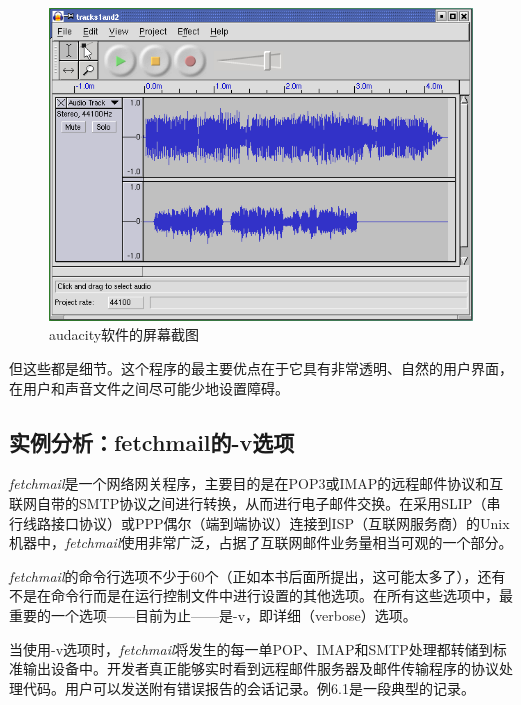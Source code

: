 \documentclass[12pt,oneside]{book}
\begin{document}
\begin{figure}[H]
\centering
\includegraphics[width=\linewidth ,totalheight=0.95\textheight , keepaspectratio]{audacity.png}
\caption{audacity软件的屏幕截图}
\end{figure}


但这些都是细节。这个程序的最主要优点在于它具有非常透明、自然的用户界面，在用户和声音文件之间尽可能少地设置障碍。

\subsection{实例分析：fetchmail的-v选项}
\textit{fetchmail}是一个网络网关程序，主要目的是在POP3或IMAP的远程邮件协议和互联网自带的SMTP协议之间进行转换，从而进行电子邮件交换。在采用SLIP（串行线路接口协议）或PPP偶尔（端到端协议）连接到ISP（互联网服务商）的Unix机器中，\textit{fetchmail}使用非常广泛，占据了互联网邮件业务量相当可观的一个部分。

\textit{fetchmail}的命令行选项不少于60个（正如本书后面所提出，这可能太多了），还有不是在命令行而是在运行控制文件中进行设置的其他选项。在所有这些选项中，最重要的一个选项——目前为止——是-v，即详细（verbose）选项。

当使用-v选项时，\textit{fetchmail}将发生的每一单POP、IMAP和SMTP处理都转储到标准输出设备中。开发者真正能够实时看到远程邮件服务器及邮件传输程序的协议处理代码。用户可以发送附有错误报告的会话记录。例6.1是一段典型的记录。
\end{document}
